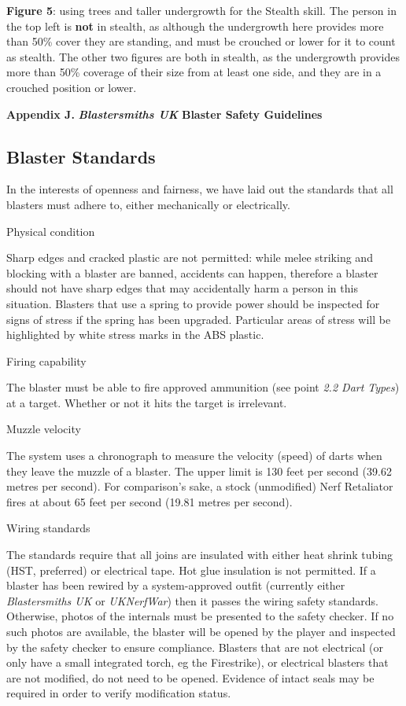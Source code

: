 \textbf{Figure 5}: using trees and taller undergrowth for the Stealth skill. The person in the top left is \textbf{not} in stealth, as although the undergrowth here provides more than 50\% cover they are standing, and must be crouched or lower for it to count as stealth. The other two figures are both in stealth, as the undergrowth provides more than 50\% coverage of their size from at least one side, and they are in a crouched position or lower.

\textbf{Appendix J.} \textbf{\textit{Blastersmiths UK}} \textbf{Blaster Safety Guidelines}

\subsection{Blaster Standards}

In the interests of openness and fairness, we have laid out the standards that all blasters must adhere to, either mechanically or electrically.

Physical condition

Sharp edges and cracked plastic are not permitted: while melee striking and blocking with a blaster are banned, accidents can happen, therefore a blaster should not have sharp edges that may accidentally harm a person in this situation. Blasters that use a spring to provide power should be inspected for signs of stress if the spring has been upgraded. Particular areas of stress will be highlighted by white stress marks in the ABS plastic.

Firing capability

The blaster must be able to fire approved ammunition (see point \textit{2.2 Dart Types}) at a target. Whether or not it hits the target is irrelevant.

Muzzle velocity

The system uses a chronograph to measure the velocity (speed) of darts when they leave the muzzle of a blaster. The upper limit is 130 feet per second (39.62 metres per second). For comparison's sake, a stock (unmodified) Nerf Retaliator fires at about 65 feet per second (19.81 metres per second).

Wiring standards

The standards require that all joins are insulated with either heat shrink tubing (HST, preferred) or electrical tape. Hot glue insulation is not permitted. If a blaster has been rewired by a system-approved outfit (currently either \textit{Blastersmiths UK} or \textit{UKNerfWar}) then it passes the wiring safety standards. Otherwise, photos of the internals must be presented to the safety checker. If no such photos are available, the blaster will be opened by the player and inspected by the safety checker to ensure compliance. Blasters that are not electrical (or only have a small integrated torch, eg the Firestrike), or electrical blasters that are not modified, do not need to be opened. Evidence of intact seals may be required in order to verify modification status.


